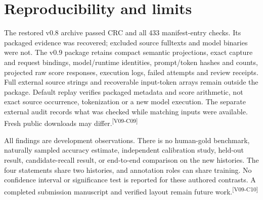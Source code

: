\documentclass[10pt,letterpaper]{article}
\newcommand{\claim}[1]{\textsuperscript{\scriptsize[#1]}}
\begin{document}
\section{Reproducibility and limits}
\label{sec:limits}
The restored v0.8 archive passed CRC and all 433 manifest-entry checks. Its
packaged evidence was recovered; excluded source fulltexts and model binaries
were not. The v0.9 package retains compact semantic projections, exact capture
and request bindings, model/runtime identities, prompt/token hashes and counts,
projected raw score responses, execution logs, failed attempts and review
receipts. Full external source strings and recoverable input-token arrays remain
outside the package. Default replay verifies packaged metadata and score
arithmetic, not exact source occurrence, tokenization or a new model execution.
The separate external audit records what was checked while matching inputs were
available. Fresh public downloads may differ.\claim{V09-C09}

All findings are development observations. There is no human-gold benchmark,
naturally sampled accuracy estimate, independent calibration study, held-out
result, candidate-recall result, or end-to-end comparison on the new histories.
The four statements share two histories, and annotation roles can share training.
No confidence interval or significance test is reported for these authored
contrasts. A completed submission manuscript and verified layout remain future
work.\claim{V09-C10}
\end{document}
